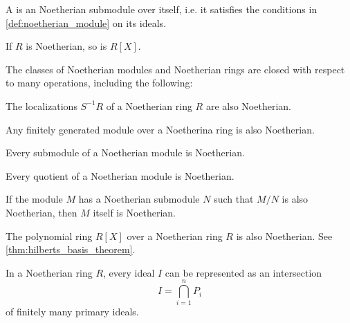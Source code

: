 \begin{definition}\label{def:noetherian_ring}
  A  is an Noetherian submodule over itself, i.e. it satisfies the conditions in \cref{def:noetherian_module} on its ideals.
\end{definition}

\begin{theorem}\label{thm:hilberts_basis_theorem}\cite[418]{Knapp2016BAlg}
  If \( R \) is Noetherian, so is \( R[X] \).
\end{theorem}

\begin{theorem}\label{thm:noetherian_rings_closed_under}
  The classes of Noetherian modules and Noetherian rings are closed with respect to many operations, including the following:

  \begin{defenum}
    \cite[corollary 8.48]{Knapp2016BAlg} The localizations \( S^{-1} R \) of a Noetherian ring \( R \) are also Noetherian.

    \cite[proposition 8.34]{Knapp2016BAlg} Any finitely generated module over a Noetherina ring is also Noetherian.

    \cite[proposition 6.3(а)]{Kocev2016} Every submodule of a Noetherian module is Noetherian.

    \cite[proposition 6.3(a)]{Kocev2016} Every quotient of a Noetherian module is Noetherian.

    \cite[proposition 6.3(b)]{Kocev2016} If the module \( M \) has a Noetherian submodule \( N \) such that \( M / N \) is also Noetherian, then \( M \) itself is Noetherian.

     The polynomial ring \( R[X] \) over a Noetherian ring \( R \) is also Noetherian. See \cref{thm:hilberts_basis_theorem}.
  \end{defenum}
\end{theorem}

\begin{theorem}\label{thm:primary_decomposition}\cite[theorem 10.6]{Kocev2016}
  In a Noetherian ring \( R \), every ideal \( I \) can be represented as an intersection
  \begin{equation*}
    I = \bigcap_{i=1}^n P_i
  \end{equation*}
  of finitely many primary ideals.
\end{theorem}
